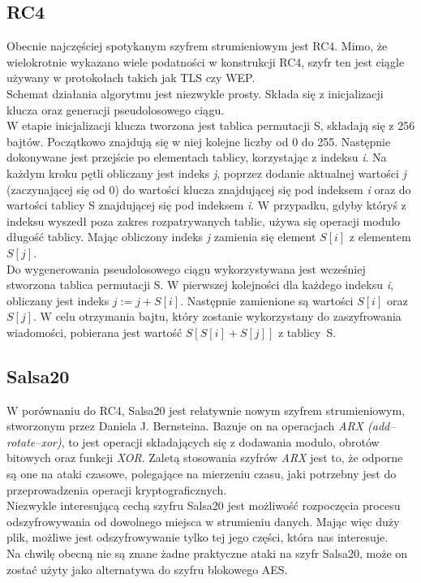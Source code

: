 \subsection{RC4}
Obecnie najczęściej spotykanym szyfrem strumieniowym jest RC4. Mimo, że wielokrotnie wykazano wiele podatności w konstrukcji RC4, szyfr ten jest ciągle używany w protokołach takich jak TLS czy WEP. \\
Schemat działania algorytmu jest niezwykle prosty. 
Składa się z inicjalizacji klucza oraz generacji pseudolosowego ciągu. \\
W etapie inicjalizacji klucza tworzona jest tablica permutacji S, składają się z 256 bajtów. 
Początkowo znajdują się w niej kolejne liczby od 0 do 255. 
Następnie dokonywane jest przejście po elementach tablicy, korzystając z indeksu \textit{i}. Na każdym kroku pętli obliczany jest indeks \textit{j}, poprzez dodanie aktualnej wartości \textit{j} (zaczynającej się od 0) do wartości klucza znajdującej się pod indeksem \textit{i} oraz do wartości tablicy S znajdującej się pod indeksem \textit{i}. W przypadku, gdyby któryś z indeksu wyszedł poza zakres rozpatrywanych tablic, używa się operacji modulo długość tablicy. Mając obliczony indeks \textit{j} zamienia się element $S[i]$ z elementem $S[j]$. \\
Do wygenerowania pseudolosowego ciągu wykorzystywana jest wcześniej stworzona tablica permutacji S. W pierwszej kolejności dla każdego indeksu \textit{i}, obliczany jest indeks $j := j + S[i]$. 
Następnie zamienione są wartości $S[i]$ oraz $S[j]$. W celu otrzymania bajtu, który zostanie wykorzystany do zaszyfrowania wiadomości, pobierana jest wartość $S[S[i] + S[j]]$ z tablicy~S.

\subsection{Salsa20}
W porównaniu do RC4, Salsa20 jest relatywnie nowym szyfrem strumieniowym, stworzonym przez Daniela J. Bernsteina. 
Bazuje on na operacjach \textit{ARX (add–rotate–xor)}, to jest operacji składających się z dodawania modulo, obrotów bitowych oraz funkcji \textit{XOR}. 
Zaletą stosowania szyfrów \textit{ARX} jest to, że odporne są one na ataki czasowe, polegające na mierzeniu czasu,
jaki potrzebny jest do przeprowadzenia operacji kryptograficznych. \\
Niezwykle interesującą cechą szyfru Salsa20 jest możliwość rozpoczęcia procesu odszyfrowywania od dowolnego miejsca w strumieniu danych. Mając więc duży plik, możliwe jest odszyfrowywanie tylko tej jego części, która nas interesuje. \\
Na chwilę obecną nie są znane żadne praktyczne ataki na szyfr Salsa20, może on zostać użyty jako alternatywa do szyfru blokowego AES.

